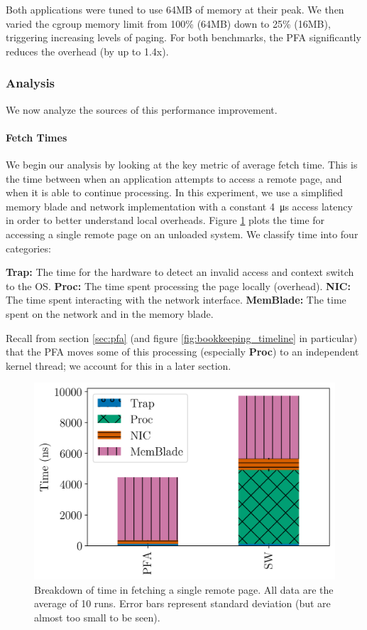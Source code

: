   Both applications were tuned to use 64MB of memory at their peak. We then
  varied the cgroup memory limit from 100\% (64MB) down to 25\% (16MB),
  triggering increasing levels of paging. For both benchmarks, the PFA
  significantly reduces the overhead (by up to 1.4x).

\subsubsection{Analysis}
  We now analyze the sources of this performance improvement.
  
  \paragraph{Fetch Times}
  We begin our analysis by looking at the key metric of average fetch time.
  This is the time between when an application attempts to access a remote
  page, and when it is able to continue processing. In this experiment, we use
  a simplified memory blade and network implementation with a constant
  \SI{4}{\micro\second} access latency in order to better understand local
  overheads. Figure \ref{fig:fetch_breakdown} plots the time for accessing a
  single remote page on an unloaded system. We classify time into four
  categories:

  \begin{outline}
    \1 \textbf{Trap:} The time for the hardware to detect an invalid access and
    context switch to the OS.
    \1 \textbf{Proc:} The time spent processing the page locally (overhead).
    \1 \textbf{NIC:} The time spent interacting with the network interface.
    \1 \textbf{MemBlade:} The time spent on the network and in the memory
    blade.
  \end{outline}

  Recall from section \ref{sec:pfa} (and figure \ref{fig:bookkeeping_timeline}
  in particular) that the PFA moves some of this processing (especially
  \textbf{Proc}) to an independent kernel thread; we account for this in a
  later section. 

  \begin{figure}[h] \centering
    \includegraphics[width=0.6\columnwidth]{figs/fetch_breakdown.png}
    \vspace{-5mm}
    \caption{Breakdown of time in fetching a single remote page. All data are 
    the average of 10 runs. Error bars represent standard deviation (but are
  almost too small to be seen).}
    \label{fig:fetch_breakdown}
  \end{figure}

